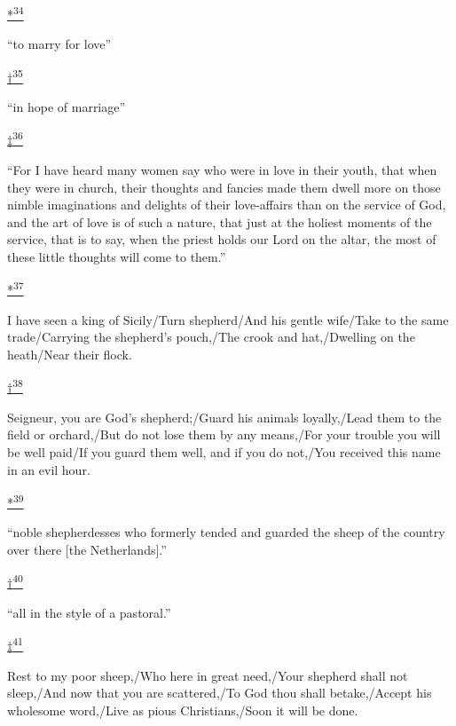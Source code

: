 \protect\hypertarget{23_NOTES.xhtmlux5cux23id_2314}{\protect\hyperlink{11_Chapter_Four__THE_FORMS_OF_LOVE.xhtmlux5cux23id_2313}{*\textsuperscript{34}}}
``to marry for love''

\protect\hypertarget{23_NOTES.xhtmlux5cux23id_2315}{\protect\hyperlink{11_Chapter_Four__THE_FORMS_OF_LOVE.xhtmlux5cux23id_2316}{†\textsuperscript{35}}}
``in hope of marriage''

\protect\hypertarget{23_NOTES.xhtmlux5cux23id_2318}{\protect\hyperlink{11_Chapter_Four__THE_FORMS_OF_LOVE.xhtmlux5cux23id_2317}{‡\textsuperscript{36}}}
``For I have heard many women say who were in love in their youth, that
when they were in church, their thoughts and fancies made them dwell
more on those nimble imaginations and delights of their love-affairs
than on the service of God, and the art of love is of such a nature,
that just at the holiest moments of the service, that is to say, when
the priest holds our Lord on the altar, the most of these little
thoughts will come to them.''

\protect\hypertarget{23_NOTES.xhtmlux5cux23id_2930}{\protect\hyperlink{11_Chapter_Four__THE_FORMS_OF_LOVE.xhtmlux5cux23id_2929}{*\textsuperscript{37}}}
I have seen a king of Sicily/Turn shepherd/And his gentle wife/Take to
the same trade/Carrying the shepherd's pouch,/The crook and
hat,/Dwelling on the heath/Near their flock.

\protect\hypertarget{23_NOTES.xhtmlux5cux23id_2932}{\protect\hyperlink{11_Chapter_Four__THE_FORMS_OF_LOVE.xhtmlux5cux23id_2931}{†\textsuperscript{38}}}
Seigneur, you are God's shepherd;/Guard his animals loyally,/Lead them
to the field or orchard,/But do not lose them by any means,/For your
trouble you will be well paid/If you guard them well, and if you do
not,/You received this name in an evil hour.

\protect\hypertarget{23_NOTES.xhtmlux5cux23id_2934}{\protect\hyperlink{11_Chapter_Four__THE_FORMS_OF_LOVE.xhtmlux5cux23id_2933}{*\textsuperscript{39}}}
``noble shepherdesses who formerly tended and guarded the sheep of the
country over there {[}the Netherlands{]}.''

\protect\hypertarget{23_NOTES.xhtmlux5cux23id_2936}{\protect\hyperlink{11_Chapter_Four__THE_FORMS_OF_LOVE.xhtmlux5cux23id_2935}{†\textsuperscript{40}}}
``all in the style of a pastoral.''

\protect\hypertarget{23_NOTES.xhtmlux5cux23id_2938}{\protect\hyperlink{11_Chapter_Four__THE_FORMS_OF_LOVE.xhtmlux5cux23id_2937}{‡\textsuperscript{41}}}
Rest to my poor sheep,/Who here in great need,/Your shepherd shall not
sleep,/And now that you are scattered,/To God thou shall betake,/Accept
his wholesome word,/Live as pious Christians,/Soon it will be done.

